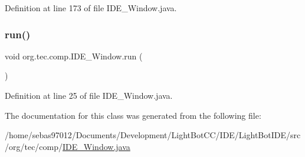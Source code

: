Definition at line 173 of file I\+D\+E\+\_\+\+Window.\+java.

\mbox{\label{classorg_1_1tec_1_1comp_1_1_i_d_e___window_a3ca2320d568f3bf02446fea735ba322e}} 
\subsubsection{\texorpdfstring{run()}{run()}}
{\footnotesize\ttfamily void org.\+tec.\+comp.\+I\+D\+E\+\_\+\+Window.\+run (\begin{DoxyParamCaption}{ }\end{DoxyParamCaption})\hspace{0.3cm}{\ttfamily [inline]}}



Definition at line 25 of file I\+D\+E\+\_\+\+Window.\+java.



The documentation for this class was generated from the following file\+:\begin{DoxyCompactItemize}
\item 
/home/sebas97012/\+Documents/\+Development/\+Light\+Bot\+C\+C/\+I\+D\+E/\+Light\+Bot\+I\+D\+E/src/org/tec/comp/\mbox{\hyperlink{_i_d_e___window_8java}{I\+D\+E\+\_\+\+Window.\+java}}\end{DoxyCompactItemize}
